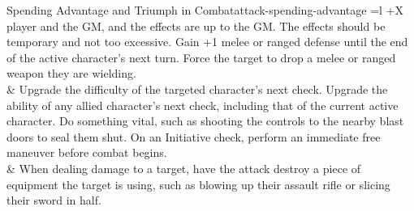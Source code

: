 \begin{multicols}{2}
\begin{table*}[!htb]
\begin{GenesysTable}{Spending Advantage and Triumph in Combat}{attack-spending-advantage}{ =l +X}
                                              player and the GM, and the effects are up to the GM. The effects should be temporary and not too excessive.\newline
                                              Gain +1 melee or ranged defense until the end of the active character's next turn.\newline
                                              Force the target to drop a melee or ranged weapon they are wielding.\\
\triumph  &         Upgrade the difficulty of the targeted character’s next check.\newline
                    Upgrade the ability of any allied character’s next check, including that of the current active character.\newline
                    Do something vital, such as shooting the controls to the nearby blast doors to seal them shut.\newline
                    On an Initiative check, perform an immediate free maneuver before combat begins.\\
\triumph\triumph  & When dealing damage to a target, have the attack destroy a
                    piece of equipment the target is using, such as blowing up
                    their assault rifle or slicing their sword in half. \\
\end{GenesysTable}
\end{table*}


\end{multicols}
